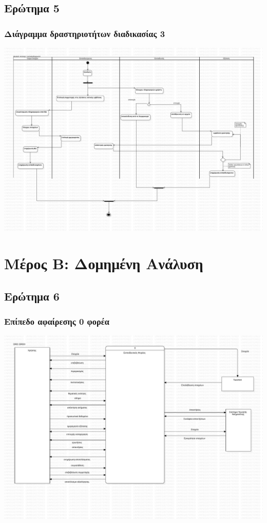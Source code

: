 \documentclass[a4paper, titlepage, twoside]{article}
\begin{document}
\subsection{Ερώτημα 5}
\label{sec:org5800110}

\subsubsection*{Διάγραμμα δραστηριοτήτων διαδικασίας 3}
\label{sec:org6c88e5f}
\begin{center}
\includegraphics[width=.9\linewidth]{activity3.pdf}
\end{center}

\section{Μέρος Β: Δομημένη Ανάλυση}
\label{sec:org054ff8c}

\subsection{Ερώτημα 6}
\label{sec:orgfbab90d}

\subsubsection*{Επίπεδο αφαίρεσης 0 φορέα}
\label{sec:org92e79f1}
\begin{center}
\includegraphics[width=.9\linewidth]{drd0.pdf}
\end{center}
\end{document}
